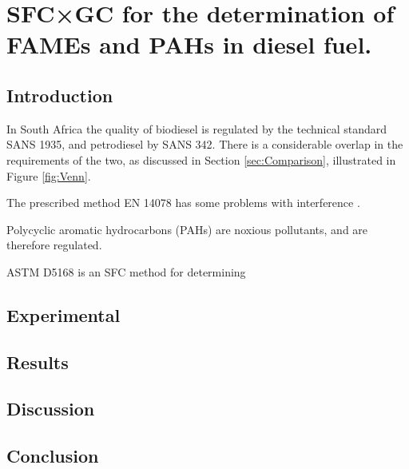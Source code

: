 
\begin{savequote}[\quotewidth]

\end{savequote}

\chapter{SFC×GC for the determination of FAMEs and PAHs in diesel fuel.} %
\label{Chapter7} %

\section{Introduction}

In South Africa the quality of biodiesel is regulated by the technical standard
SANS 1935, and petrodiesel by SANS 342. There is a considerable overlap in the
requirements of the two, as discussed in Section \ref{sec:Comparison},
illustrated in Figure \ref{fig:Venn}.

The prescribed method  EN 14078 has some problems with interference \autocite{Pinho2014} . 

Polycyclic aromatic hydrocarbons (PAHs) are noxious pollutants, and are therefore regulated. 

ASTM D5168 is an SFC method for determining

\section{Experimental}



\section{Results}


\section{Discussion}


\section{Conclusion}

\todos